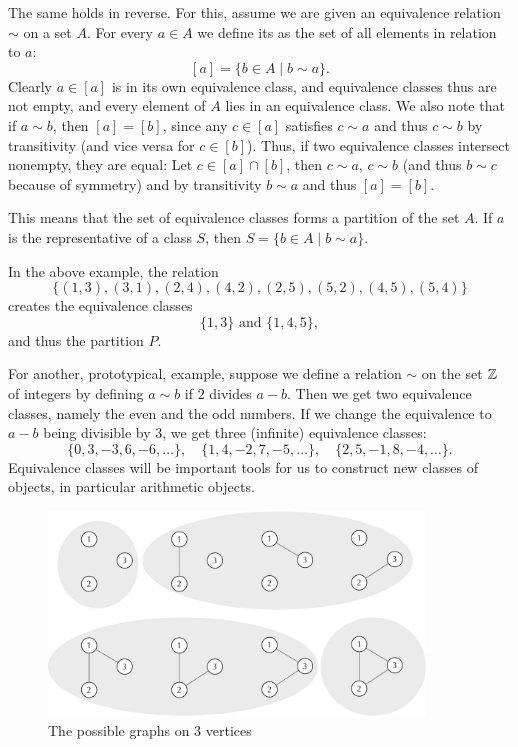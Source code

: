 The same holds in reverse. For this, assume we are given an equivalence
relation $\sim$ on a set $A$. For every $a\in A$ we 
define its  as the set of all elements in relation
to $a$:
\[
[a]=\{b\in A\mid b\sim a\}.
\]
Clearly $a\in[a]$ is in its own equivalence class, and equivalence classes
thus are not empty, and every element of $A$ lies in an equivalence class.
We also note that if $a\sim b$, then $[a]=[b]$, since any $c\in[a]$
satisfies $c\sim a$ and thus $c\sim b$ by transitivity (and vice versa for
$c\in[b]$). Thus, if two equivalence classes intersect nonempty, they are
equal: Let $c\in [a]\cap [b]$, then $c\sim a$, $c\sim b$ (and thus $b\sim c$
because of symmetry) and by transitivity $b\sim a$ and thus $[a]=[b]$.

This means that the set of equivalence classes forms a partition of the set
$A$. If $a$ is the representative of a class $S$, then $S=\{b\in A\mid b\sim a\}$.

In the above example, the relation 
\[
\{(1,3),(3,1),(2,4),(4,2),(2,5),(5,2),(4,5),(5,4)\}
\]
creates the equivalence classes
\[
\{1,3\}\mbox{\ and\ }\{1,4,5\},
\] and thus the partition $P$.

For another, prototypical, example, suppose we define a relation $\sim$ on the set ${\mathbb Z}$ of
integers by defining $a\sim b$ if $2$ divides $a-b$. Then we get two
equivalence classes, namely the even and the odd numbers. If we change the
equivalence to $a-b$ being divisible by $3$, we get three
(infinite) equivalence classes:
\[
\{0,3,-3,6,-6,\ldots\},\quad
\{1,4,-2,7,-5,\ldots\},\quad
\{2,5,-1,8,-4,\ldots\}.
\]
Equivalence classes will be important tools for us to construct new classes
of objects, in particular arithmetic objects.
\medskip

\begin{figure}[t]
\begin{center}
\includegraphics[width=10cm]{pic/GraphIsoClasses.pdf}
\end{center}
\caption{The possible graphs on 3 vertices}
\label{3vertexgraphs}
\end{figure}


